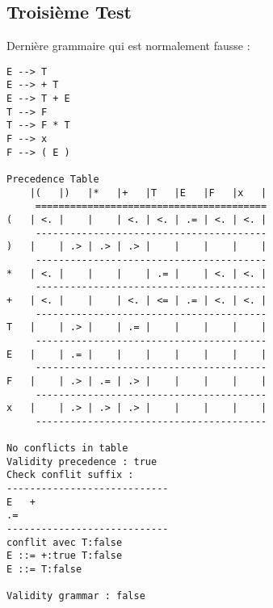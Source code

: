 \subsection{Troisième Test}
Dernière grammaire qui est normalement fausse :
{\tiny
\begin{verbatim}
E --> T 
E --> + T 
E --> T + E 
T --> F 
T --> F * T 
F --> x 
F --> ( E ) 

Precedence Table
    |(   |)   |*   |+   |T   |E   |F   |x   |
     ========================================
(   | <. |    |    | <. | <. | .= | <. | <. |
     ----------------------------------------
)   |    | .> | .> | .> |    |    |    |    |
     ----------------------------------------
*   | <. |    |    |    | .= |    | <. | <. |
     ----------------------------------------
+   | <. |    |    | <. | <= | .= | <. | <. |
     ----------------------------------------
T   |    | .> |    | .= |    |    |    |    |
     ----------------------------------------
E   |    | .= |    |    |    |    |    |    |
     ----------------------------------------
F   |    | .> | .= | .> |    |    |    |    |
     ----------------------------------------
x   |    | .> | .> | .> |    |    |    |    |
     ----------------------------------------

No conflicts in table
Validity precedence : true
Check conflit suffix : 
----------------------------
E   +
.=
----------------------------
conflit avec T:false
E ::= +:true T:false
E ::= T:false 

Validity grammar : false
\end{verbatim}
}

